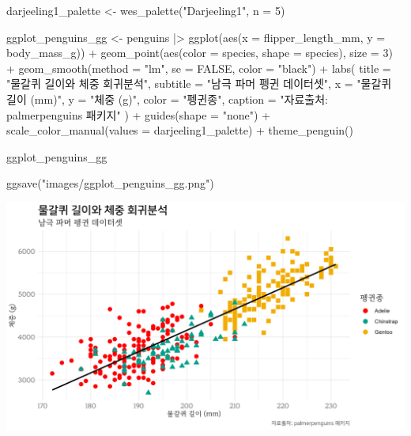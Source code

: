 \documentclass[
  letterpaper,
]{book}
\newenvironment{Shaded}{\begin{snugshade}}{\end{snugshade}}
\newcommand{\AttributeTok}[1]{\textcolor[rgb]{0.40,0.45,0.13}{#1}}
\newcommand{\ConstantTok}[1]{\textcolor[rgb]{0.56,0.35,0.01}{#1}}
\newcommand{\DecValTok}[1]{\textcolor[rgb]{0.68,0.00,0.00}{#1}}
\newcommand{\FunctionTok}[1]{\textcolor[rgb]{0.28,0.35,0.67}{#1}}
\newcommand{\NormalTok}[1]{\textcolor[rgb]{0.00,0.23,0.31}{#1}}
\newcommand{\OtherTok}[1]{\textcolor[rgb]{0.00,0.23,0.31}{#1}}
\newcommand{\SpecialCharTok}[1]{\textcolor[rgb]{0.37,0.37,0.37}{#1}}
\newcommand{\StringTok}[1]{\textcolor[rgb]{0.13,0.47,0.30}{#1}}
\begin{document}
\begin{Shaded}
\begin{Highlighting}[]
\NormalTok{darjeeling1\_palette }\OtherTok{\textless{}{-}} \FunctionTok{wes\_palette}\NormalTok{(}\StringTok{"Darjeeling1"}\NormalTok{, }\AttributeTok{n =} \DecValTok{5}\NormalTok{)}

\NormalTok{ggplot\_penguins\_gg }\OtherTok{\textless{}{-}}\NormalTok{ penguins }\SpecialCharTok{|\textgreater{}} 
  \FunctionTok{ggplot}\NormalTok{(}\FunctionTok{aes}\NormalTok{(}\AttributeTok{x =}\NormalTok{ flipper\_length\_mm, }\AttributeTok{y =}\NormalTok{ body\_mass\_g)) }\SpecialCharTok{+}
    \FunctionTok{geom\_point}\NormalTok{(}\FunctionTok{aes}\NormalTok{(}\AttributeTok{color =}\NormalTok{ species, }\AttributeTok{shape =}\NormalTok{ species), }\AttributeTok{size =} \DecValTok{3}\NormalTok{) }\SpecialCharTok{+}
    \FunctionTok{geom\_smooth}\NormalTok{(}\AttributeTok{method =} \StringTok{"lm"}\NormalTok{, }\AttributeTok{se =} \ConstantTok{FALSE}\NormalTok{, }\AttributeTok{color =} \StringTok{"black"}\NormalTok{)  }\SpecialCharTok{+}
    \FunctionTok{labs}\NormalTok{(}
      \AttributeTok{title =} \StringTok{"물갈퀴 길이와 체중 회귀분석"}\NormalTok{,}
      \AttributeTok{subtitle =} \StringTok{"남극 파머 펭귄 데이터셋"}\NormalTok{,}
      \AttributeTok{x =} \StringTok{"물갈퀴 길이 (mm)"}\NormalTok{,}
      \AttributeTok{y =} \StringTok{"체중 (g)"}\NormalTok{,}
      \AttributeTok{color =} \StringTok{"펭귄종"}\NormalTok{,}
      \AttributeTok{caption =} \StringTok{"자료출처: palmerpenguins 패키지"}
\NormalTok{    ) }\SpecialCharTok{+}
  \FunctionTok{guides}\NormalTok{(}\AttributeTok{shape =} \StringTok{"none"}\NormalTok{) }\SpecialCharTok{+}
  \FunctionTok{scale\_color\_manual}\NormalTok{(}\AttributeTok{values =}\NormalTok{  darjeeling1\_palette) }\SpecialCharTok{+}
  \FunctionTok{theme\_penguin}\NormalTok{()}

\NormalTok{ggplot\_penguins\_gg}

\FunctionTok{ggsave}\NormalTok{(}\StringTok{"images/ggplot\_penguins\_gg.png"}\NormalTok{)}
\end{Highlighting}
\end{Shaded}

\includegraphics{images/ggplot_penguins_gg.png}
\end{document}
